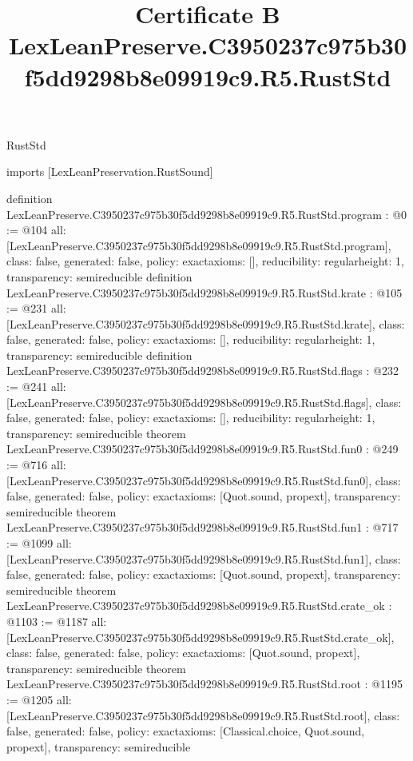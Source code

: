 \begin{lexlean}{RustStd}
\title{Certificate B LexLeanPreserve.C3950237c975b30f5dd9298b8e09919c9.R5.RustStd}
\begin{coremodule}
imports [LexLeanPreservation.RustSound]

definition LexLeanPreserve.C3950237c975b30f5dd9298b8e09919c9.R5.RustStd.program : @0 := @104 {
  all: [LexLeanPreserve.C3950237c975b30f5dd9298b8e09919c9.R5.RustStd.program],
  class: false,
  generated: false,
  policy: exact{axioms: []},
  reducibility: regular{height: 1},
  transparency: semireducible
}
definition LexLeanPreserve.C3950237c975b30f5dd9298b8e09919c9.R5.RustStd.krate : @105 := @231 {
  all: [LexLeanPreserve.C3950237c975b30f5dd9298b8e09919c9.R5.RustStd.krate],
  class: false,
  generated: false,
  policy: exact{axioms: []},
  reducibility: regular{height: 1},
  transparency: semireducible
}
definition LexLeanPreserve.C3950237c975b30f5dd9298b8e09919c9.R5.RustStd.flags : @232 := @241 {
  all: [LexLeanPreserve.C3950237c975b30f5dd9298b8e09919c9.R5.RustStd.flags],
  class: false,
  generated: false,
  policy: exact{axioms: []},
  reducibility: regular{height: 1},
  transparency: semireducible
}
theorem LexLeanPreserve.C3950237c975b30f5dd9298b8e09919c9.R5.RustStd.fun0 : @249 := @716 {
  all: [LexLeanPreserve.C3950237c975b30f5dd9298b8e09919c9.R5.RustStd.fun0],
  class: false,
  generated: false,
  policy: exact{axioms: [Quot.sound, propext]},
  transparency: semireducible
}
theorem LexLeanPreserve.C3950237c975b30f5dd9298b8e09919c9.R5.RustStd.fun1 : @717 := @1099 {
  all: [LexLeanPreserve.C3950237c975b30f5dd9298b8e09919c9.R5.RustStd.fun1],
  class: false,
  generated: false,
  policy: exact{axioms: [Quot.sound, propext]},
  transparency: semireducible
}
theorem LexLeanPreserve.C3950237c975b30f5dd9298b8e09919c9.R5.RustStd.crate_ok : @1103 := @1187 {
  all: [LexLeanPreserve.C3950237c975b30f5dd9298b8e09919c9.R5.RustStd.crate_ok],
  class: false,
  generated: false,
  policy: exact{axioms: [Quot.sound, propext]},
  transparency: semireducible
}
theorem LexLeanPreserve.C3950237c975b30f5dd9298b8e09919c9.R5.RustStd.root : @1195 := @1205 {
  all: [LexLeanPreserve.C3950237c975b30f5dd9298b8e09919c9.R5.RustStd.root],
  class: false,
  generated: false,
  policy: exact{axioms: [Classical.choice, Quot.sound, propext]},
  transparency: semireducible
}


\end{coremodule}
\end{lexlean}
